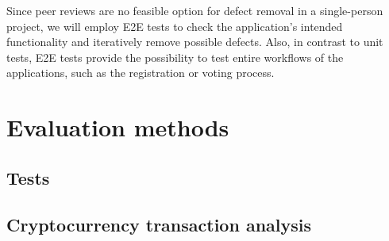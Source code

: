 Since peer reviews are no feasible option for defect removal in a single-person project, we will employ E2E tests to check the application’s intended functionality and iteratively remove possible defects.
Also, in contrast to unit tests, \gls{E2E} tests provide the possibility to test entire workflows of the applications, such as the registration or voting process.

\section{Evaluation methods}\label{sec:evaluation-methods}

\subsection{Tests}\label{subsec:tests}
\subsection{Cryptocurrency transaction analysis}\label{subsec:crypto-currency-transaction-analysis}